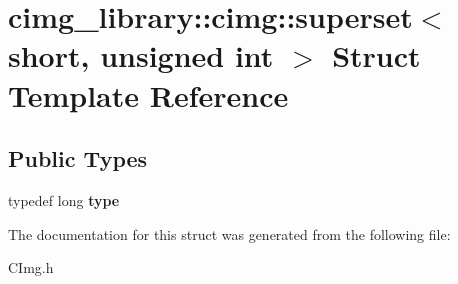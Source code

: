 \hypertarget{structcimg__library_1_1cimg_1_1superset_3_01short_00_01unsigned_01int_01_4}{\section{cimg\-\_\-library\-:\-:cimg\-:\-:superset$<$ short, unsigned int $>$ Struct Template Reference}
\label{structcimg__library_1_1cimg_1_1superset_3_01short_00_01unsigned_01int_01_4}
}
\subsection*{Public Types}
\begin{DoxyCompactItemize}
\item 
\hypertarget{structcimg__library_1_1cimg_1_1superset_3_01short_00_01unsigned_01int_01_4_acbe53949e57cb62eff5dba29f0b45388}{typedef long {\bfseries type}}\label{structcimg__library_1_1cimg_1_1superset_3_01short_00_01unsigned_01int_01_4_acbe53949e57cb62eff5dba29f0b45388}

\end{DoxyCompactItemize}


The documentation for this struct was generated from the following file\-:\begin{DoxyCompactItemize}
\item 
C\-Img.\-h\end{DoxyCompactItemize}
